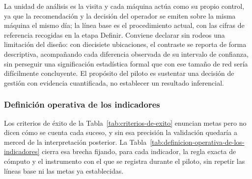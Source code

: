 La unidad de análisis es la visita y cada máquina actúa como su propio control, ya que la recomendación y la decisión del operador se emiten sobre la misma máquina el mismo día; la línea base es el procedimiento actual, con las cifras de referencia recogidas en la etapa Definir. Conviene declarar sin rodeos una limitación del diseño: con diecisiete ubicaciones, el contraste se reporta de forma descriptiva, acompañando cada diferencia observada de su intervalo de confianza, sin perseguir una significación estadística formal que con ese tamaño de red sería difícilmente concluyente. El propósito del piloto es sustentar una decisión de gestión con evidencia cuantificada, no establecer un resultado inferencial.

\subsubsection{Definición operativa de los indicadores}\label{definicion-operativa-de-los-indicadores}

Los criterios de éxito de la Tabla~\ref{tab:criterios-de-exito} enuncian metas pero no dicen cómo se cuenta cada suceso, y sin esa precisión la validación quedaría a merced de la interpretación posterior. La Tabla~\ref{tab:definicion-operativa-de-los-indicadores} cierra esa brecha fijando, para cada indicador, la regla exacta de cómputo y el instrumento con el que se registra durante el piloto, sin repetir las líneas base ni las metas ya establecidas.

\label{tab:definicion-operativa-de-los-indicadores}

